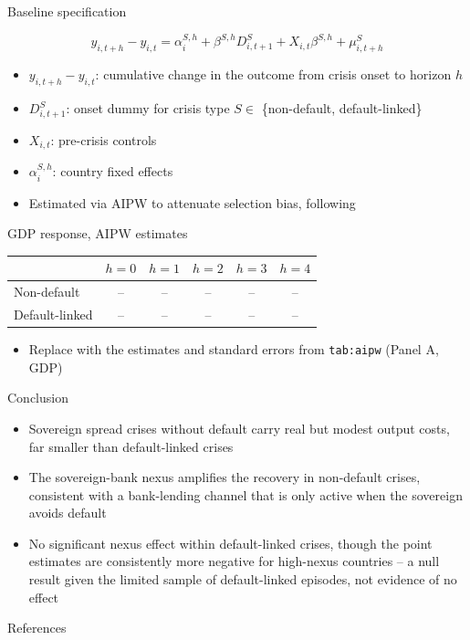 \documentclass[aspectratio=169]{beamer}
\begin{document}
\begin{frame}{Baseline specification}
  \begin{center}
    \[
    y_{i,t+h} - y_{i,t} = \alpha_i^{S,h} + \beta^{S,h} D_{i,t+1}^{S} + X_{i,t}\beta^{S,h} + \mu_{i,t+h}^{S}
    \]
  \end{center}
  \vspace{0.5em}
  \begin{itemize}
    \item $y_{i,t+h} - y_{i,t}$: cumulative change in the outcome from crisis
    onset to horizon $h$
    \item $D_{i,t+1}^{S}$: onset dummy for crisis type $S \in$ \{non-default,
    default-linked\}
    \item $X_{i,t}$: pre-crisis controls
    \item $\alpha_i^{S,h}$: country fixed effects
    \item Estimated via AIPW to attenuate selection bias, following
    \citet{jorda2016time}
  \end{itemize}
\end{frame}

\begin{frame}{GDP response, AIPW estimates}
  \begin{center}
    \footnotesize
    \begin{tabular}{lccccc}
      \toprule
       & $h=0$ & $h=1$ & $h=2$ & $h=3$ & $h=4$ \\
      \midrule
      Non-default & -- & -- & -- & -- & -- \\
      Default-linked & -- & -- & -- & -- & -- \\
      \bottomrule
    \end{tabular}
  \end{center}
  \vspace{0.5em}
  \begin{itemize}
    \item Replace with the estimates and standard errors from
    \texttt{tab:aipw} (Panel A, GDP)
  \end{itemize}
\end{frame}

\begin{frame}{Conclusion}
  \begin{itemize}
    \item Sovereign spread crises without default carry real but modest
    output costs, far smaller than default-linked crises
    \item The sovereign-bank nexus amplifies the recovery in non-default
    crises, consistent with a bank-lending channel that is only active when
    the sovereign avoids default
    \item No significant nexus effect within default-linked crises, though
    the point estimates are consistently more negative for high-nexus
    countries -- a null result given the limited sample of default-linked
    episodes, not evidence of no effect
  \end{itemize}
\end{frame}

\begin{frame}[allowframebreaks]{References}
  \footnotesize
  
  
\end{frame}
\end{document}
